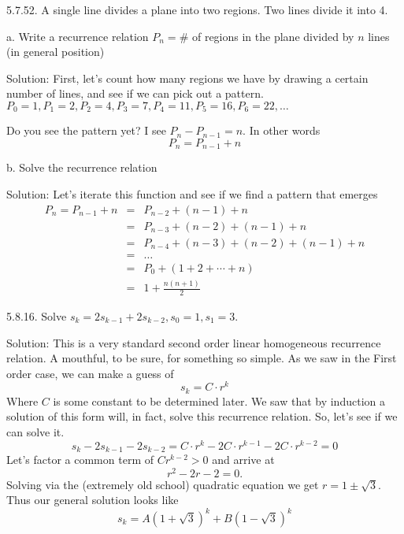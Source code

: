 \documentclass[16 pt]{amsart}
\theoremstyle{definition}
\theoremstyle{remark}
\numberwithin{equation}{section}
\begin{document}
5.7.52. A single line divides a plane into two regions.  Two lines divide it into 4. 

a. Write a recurrence relation $P_n = \#$ of regions in the plane divided by $n$ lines (in general position)

\vspace{.5in}

Solution: First, let's count how many regions we have by drawing a certain number of lines, and see if we can pick out a pattern.
$P_0=1, P_1=2,P_2=4,P_3=7,P_4=11,P_5=16,P_6=22,\dots$


Do you see the pattern yet?  I see $P_n-P_{n-1}=n$.  In other words
\[
P_n = P_{n-1}+n
\]

\vspace{.5in}

b. Solve the recurrence relation

\vspace{.5in}

Solution: Let's iterate this function and see if we find a pattern that emerges
\begin{eqnarray*}
P_n = P_{n-1}+n & = & P_{n-2} + (n-1) + n \\
& = & P_{n-3} + (n-2)+(n-1) + n\\ 
& = & P_{n-4} + (n-3) + (n-2) + (n-1) + n \\
& = & \dots\\
& = & P_0 + (1+2+ \cdots + n)\\
& = & 1 + \frac{n(n+1)}{2}
\end{eqnarray*}

\newpage


5.8.16. Solve $s_k = 2s_{k-1} + 2s_{k-2}, s_0=1, s_1=3$.

\vspace{1in}

Solution: This is a very standard second order linear homogeneous recurrence relation.  A mouthful, to be sure, for something so simple.  As we saw in the First order case, we can make a guess of
\[
s_k = C\cdot r^k
\]
Where $C$ is some constant to be determined later.  We saw that by induction a solution of this form will, in fact, solve this recurrence relation.  So, let's see if we can solve it.
\[
s_k - 2 s_{k-1} - 2s_{k-2} = C\cdot r^k - 2C\cdot r^{k-1} - 2C\cdot r^{k-2} = 0
\] 
Let's factor a common term of $Cr^{k-2}>0$ and arrive at
\[
r^2-2r-2=0.
\]
Solving via the (extremely old school) quadratic equation we get $r = 1\pm \sqrt{3}$. Thus our general solution looks like
\[
s_k = A (1+\sqrt{3})^k + B(1-\sqrt{3})^k
\]
\end{document}
